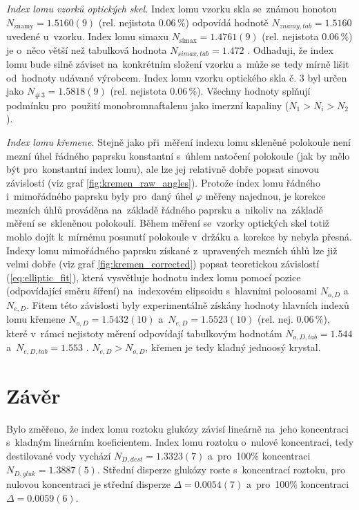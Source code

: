 \documentclass{../concepts/titul_protokol_p/prepareprotokol} %
\begin{document}
\textit{Index lomu vzorků optických skel.} Index lomu vzorku skla se~známou honotou $N_\mathrm{znamy} = 1.5160(9)$ 
(rel. nejistota $0.06\,\%$) odpovídá hodnotě $N_{znamy,tab} = 1.5160$ uvedené u~vzorku. Index lomu simaxu
$N_\mathrm{simax} = 1.4761(9)$ (rel. nejistota $0.06\,\%$) je o~něco větší než tabulková hodnota 
$N_{simax,tab} = 1.472$ \cite{simax}. Odhaduji,
že index lomu bude silně záviset na~konkrétním složení vzorku a~může se~tedy mírně lišit od~hodnoty udávané
výrobcem. Index lomu vzorku optického skla č. 3 byl určen jako $N_{\# \,3} = 1.5818(9)$ (rel. nejistota $0.06\,\%$).
Všechny hodnoty splňují podmínku pro~použití monobromnaftalenu jako imerzní kapaliny ($N_1 > N_i > N_2$).

\textit{Index lomu křemene.} Stejně jako při~měření indexu lomu skleněné polokoule není mezní úhel
řádného paprsku konstantní s~úhlem natočení polokoule (jak by mělo být pro~konstantní index lomu), 
ale lze jej relativně dobře popsat sinovou závislostí (viz graf \ref{fig:kremen_raw_angles}). Protože
index lomu řádného i~mimořádného paprsku byly pro~daný úhel $\varphi$ měřeny najednou, je korekce mezních úhlů
prováděna na~základě řádného paprsku a~nikoliv na~základě měření se~skleněnou polokoulí. Během měření
se~vzorky optických skel totiž mohlo dojít k~mírnému posunutí polokoule v~držáku a~korekce by nebyla přesná.
Indexy lomu mimořádného paprsku získané z~upravených mezních úhlů lze již velmi dobře 
(viz graf \ref{fig:kremen_corrected}) popsat teoretickou závislostí (\ref{eq:elliptic_fit}), která vysvětluje
hodnotu index lomu pomocí pozice (odpovídající směru šíření) na~indexovém elipsoidu s~hlavními poloosami $N_{o,D}$
a~$N_{e,D}$. Fitem této závislosti byly experimentálně získány hodnoty hlavních indexů lomu křemene 
$N_{o,D} = 1.5432(10)$ a~$N_{e,D} = 1.5523(10)$ (rel. nej. $0.06\,\%$), které v~rámci nejistoty měrení odpovídají
tabulkovým hodnotám $N_{o,D,tab} = 1.544$ a~$N_{e,D,tab} = 1.553$ \cite{mikulcak}. $N_{e,D} > N_{o,D}$,
křemen je tedy kladný jednoosý krystal.

\section{Závěr}

Bylo změřeno, že index lomu roztoku glukózy závisí lineárně na~jeho koncentraci s~kladným lineárním koeficientem.
Index lomu roztoku o~nulové koncentraci, tedy destilované vody vychází $N_{D,dest}=1.3323(7)$ a~pro~100\% koncentraci
$N_{D,gluk} = 1.3887(5)$. Střední disperze
glukózy roste s~koncentrací roztoku, pro nulovou koncentraci je střední disperze $\Delta = 0.0054(7)$
a~pro~100\% koncentraci $\Delta = 0.0059(6)$.
\end{document}
